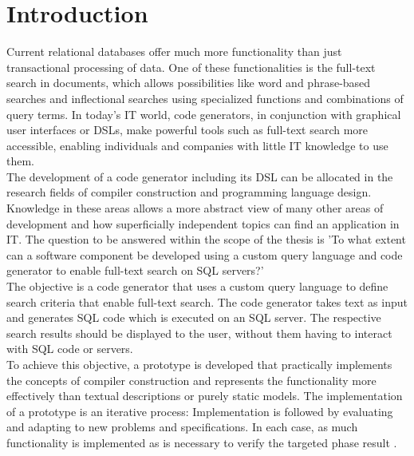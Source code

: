 \section{Introduction}
Current relational databases offer much more functionality than just transactional processing of data. One of these functionalities is the full-text search in documents, which allows possibilities like word and phrase-based searches and inflectional searches using specialized functions and combinations of query terms. In today's IT world, code generators, in conjunction with graphical user interfaces or \ac{DSL}s, make powerful tools such as full-text search more accessible, enabling individuals and companies with little IT knowledge to use them.\\
The development of a code generator including its \ac{DSL} can be allocated in the research fields of compiler construction and programming language design. Knowledge in these areas allows a more abstract view of many other areas of development and how superficially independent topics can find an application in IT. The question to be answered within the scope of the thesis is 'To what extent can a software component be developed using a custom query language and code generator to enable full-text search on \ac{SQL} servers?'\\
The objective is a code generator that uses a custom query language to define search criteria that enable full-text search. The code generator takes text as input and generates \ac{SQL} code which is executed on an \ac{SQL} server. The respective search results should be displayed to the user, without them having to interact with \ac{SQL} code or servers.\\
To achieve this objective, a prototype is developed that practically implements the concepts of compiler construction and represents the functionality more effectively than textual descriptions or purely static models. The implementation of a prototype is an iterative process: Implementation is followed by evaluating and adapting to new problems and specifications. In each case, as much functionality is implemented as is necessary to verify the targeted phase result \parencite[cf.][p. 3]{pomberger_methoden_1992}.